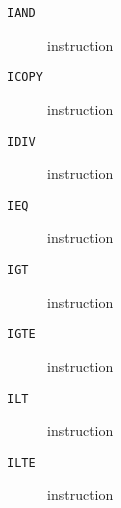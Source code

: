 \clearpage
\begin{description}
\item[\texttt{IAND}] instruction\\

\end{description}
\clearpage
\begin{description}
\item[\texttt{ICOPY}] instruction\\

\end{description}
\clearpage
\begin{description}
\item[\texttt{IDIV}] instruction\\

\end{description}
\clearpage
\begin{description}
\item[\texttt{IEQ}] instruction\\

\end{description}
\clearpage
\begin{description}
\item[\texttt{IGT}] instruction\\

\end{description}
\clearpage
\begin{description}
\item[\texttt{IGTE}] instruction\\

\end{description}
\clearpage
\begin{description}
\item[\texttt{ILT}] instruction\\

\end{description}
\clearpage
\begin{description}
\item[\texttt{ILTE}] instruction\\

\end{description}
